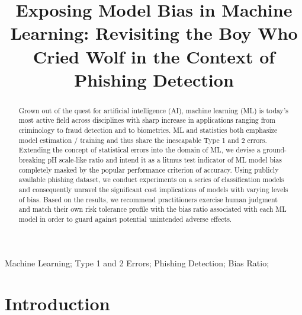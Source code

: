 \documentclass[]{interact}
\theoremstyle{plain}%
\theoremstyle{definition}
\theoremstyle{remark}
\begin{document}

\title{Exposing Model Bias in Machine Learning: Revisiting the Boy Who Cried Wolf in the Context of Phishing Detection}

\author{
}

\maketitle

\begin{abstract}
Grown out of the quest for artificial intelligence (AI), machine learning (ML) is today's most active field across disciplines with sharp increase in applications ranging from criminology to fraud detection and to biometrics. ML and statistics both emphasize model estimation / training and thus share the inescapable Type 1 and 2 errors. Extending the concept of statistical errors into the domain of ML, we devise a ground-breaking pH scale-like ratio and intend it as a litmus test indicator of ML model bias completely masked by the popular performance criterion of accuracy. Using publicly available phishing dataset, we conduct experiments on a series of classification models and consequently unravel the significant cost implications of models with varying levels of bias. Based on the results, we recommend practitioners exercise human judgment and match their own risk tolerance profile with the bias ratio associated with each ML model in order to guard against potential unintended adverse effects.
\end{abstract}

\begin{keywords}
Machine Learning; Type 1 and 2 Errors; Phishing Detection; Bias Ratio;
\end{keywords}


\section{Introduction}
\end{document}
